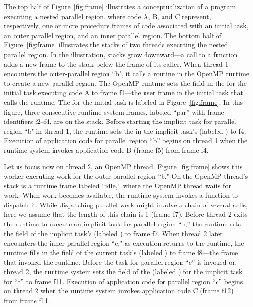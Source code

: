 The top half of Figure~\ref{fig:frame} illustrates a 
conceptualization of a program executing a nested
parallel region, where code A, B, and C represent, respectively, one
or more procedure frames of code
associated with an initial task, an outer parallel region, and an inner parallel
region. The bottom half of Figure~\ref{fig:frame} illustrates the stacks of two
threads executing the nested parallel region. 
In the illustration, stacks grow downward---a call to a function adds
a new frame to the stack below the frame of its caller.
When thread 1 encounters the outer-parallel
region ``b", it calls a routine in the OpenMP runtime to
create a new parallel region. The OpenMP runtime sets the
 field in the  for the initial
task executing code A to frame f1---the user frame in the initial task
that calls the runtime. The  for the initial task
is labeled  in Figure~\ref{fig:frame}. In this figure, three
consecutive runtime system frames, labeled ``par'' with frame
identifiers f2--f4, are on the stack.  Before starting the implicit
task for parallel region ``b" in thread 1, the runtime sets the
 in the implicit task's  (labeled
) to f4. Execution of application code for parallel region
``b'' begins on thread 1 when the runtime system invokes application
code B (frame f5) from frame f4.

Let us focus now on thread 2, an OpenMP thread. Figure~\ref{fig:frame}
shows this worker executing work for the outer-parallel region ``b."
On the OpenMP thread's stack is a runtime frame labeled ``idle,''
where the OpenMP thread waits for work.  When work becomes available,
the runtime system invokes a function to dispatch it. While
dispatching parallel work might involve a chain of several calls, here
we assume that the length of this chain is 1 (frame f7).  Before
thread 2 exits the runtime to execute an implicit task for parallel
region ``b,'' the runtime sets the  field of the
implicit task's  (labeled ) to frame f7.
When thread 2 later encounters the inner-parallel region ``c," as
execution returns to the runtime, the runtime fills in the
 field of the current task's 
(labeled ) to frame f8---the frame that invoked the
runtime. Before the task for parallel region ``c'' is invoked on
thread 2, the runtime system sets the  field of the
 (labeled ) for the implicit task for
``c'' to frame f11. Execution of application code for parallel region
``c'' begins on thread 2 when the runtime system invokes application
code C (frame f12) from frame f11.


